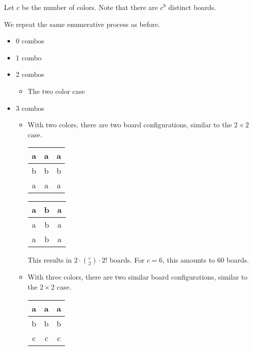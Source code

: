 \documentclass[12pt]{article}
\theoremstyle{definition}
\begin{document}
Let $c$ be the number of colors. Note that there are $c^9$ distinct boards.

We repeat the same enumerative process as before.
\begin{itemize}
    \item 0 combos
    \item 1 combo
    \item 2 combos
    \begin{itemize}
        \item The two color case
    \end{itemize}
    \item 3 combos
    \begin{itemize}
        \item With two colors, there are two board configurations, similar to the $2\times 2$ case.
        \begin{center}
            \begin{tabular}{|c|c|c|}
                \hline
                a & a & a \\
                \hline
                b & b & b \\
                \hline
                a & a & a \\
                \hline
            \end{tabular}
            \qquad\qquad
            \begin{tabular}{|c|c|c|}
                \hline
                a & b & a \\
                \hline
                a & b & a \\
                \hline
                a & b & a \\
                \hline
            \end{tabular}
        \end{center}
        This results in $2\cdot \binom{c}{2}\cdot 2!$ boards. For $c=6$, this amounts to 60 boards.
        \item With three colors, there are two similar board configurations, similar to the $2\times 2$ case.
        \begin{center}
            \begin{tabular}{|c|c|c|}
                \hline
                a & a & a \\
                \hline
                b & b & b \\
                \hline
                c & c & c \\
                \hline
            \end{tabular}

\end{center}
\end{itemize}
\end{itemize}
\end{document}
